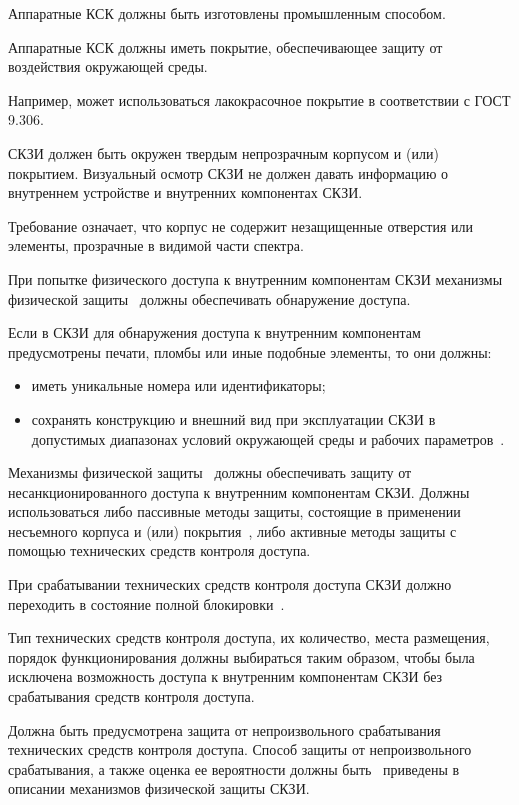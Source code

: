 \label{R.PS.Production}
Аппаратные КСК должны быть изготовлены промышленным способом.

\label{R.PS.Passivation}
Аппаратные КСК должны иметь покрытие, обеспечивающее защиту от воздействия 
окружающей среды. 

\begin{note}
Например, может использоваться лакокрасочное покрытие
в соответствии с ГОСТ 9.306. 
\end{note}


\label{R.PS.Coating}
СКЗИ должен быть окружен твердым непрозрачным корпусом и (или) покрытием.
%
Визуальный осмотр СКЗИ не должен давать информацию о внутреннем устройстве 
и внутренних компонентах СКЗИ.

\begin{note}
Требование означает, что корпус не содержит незащищенные отверстия
или элементы, прозрачные в видимой части спектра. 
\end{note}


\label{R.PS.PassiveDetection}
При попытке физического доступа к внутренним компонентам СКЗИ механизмы 
физической защиты~ должны обеспечивать обнаружение доступа. 

\label{R.PS.PassiveDetectionId}
Если в СКЗИ для обнаружения доступа к внутренним компонентам предусмотрены 
печати, пломбы или иные подобные элементы, то они должны:
\begin{itemize}
\item
иметь уникальные номера или идентификаторы;
\item
сохранять конструкцию и внешний вид при эксплуатации СКЗИ в допустимых 
диапазонах условий окружающей среды и рабочих параметров~. 
\end{itemize}


\label{R.PS.ActiveDetectionSensor}
Механизмы физической защиты~ должны обеспечивать 
защиту от несанкционированного доступа к внутренним компонентам
СКЗИ. 
%
Должны использоваться либо пассивные методы защиты, состоящие в применении 
несъемного корпуса и (или) покрытия~, либо 
активные методы защиты с помощью технических средств контроля доступа.

\label{R.PS.Erasing}
При срабатывании технических средств контроля доступа СКЗИ должно 
переходить в состояние полной блокировки~.

\label{R.PS.SensorsQuality}
Тип технических средств контроля доступа, их количество, места 
размещения, порядок функционирования должны выбираться таким образом, 
чтобы была исключена возможность доступа к внутренним компонентам СКЗИ 
без срабатывания средств контроля доступа.  

\label{R.PS.SensorsFaults}
Должна быть предусмотрена защита от непроизвольного срабатывания технических 
средств контроля доступа. Способ защиты от непроизвольного срабатывания, 
а также оценка ее вероятности должны быть~ 
приведены в описании механизмов физической защиты СКЗИ.
